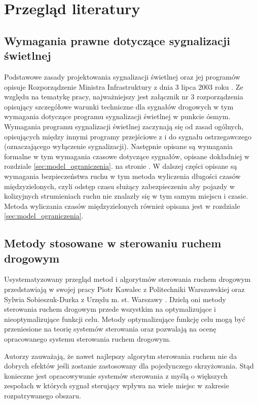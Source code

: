 \chapter{Przegląd literatury}
\section{Wymagania prawne dotyczące sygnalizacji świetlnej}
Podstawowe zasady projektowania sygnalizacji świetlnej oraz jej programów opisuje Rozporządzenie Ministra Infrastruktury z dnia 3 lipca 2003 roku \cite{rozporzadzenie}.
Ze względu na tematykę pracy, najważniejszy jest załącznik nr 3 rozporządzenia opisujący szczegółowe warunki techniczne dla sygnałów drogowych w tym wymagania dotyczące programu sygnalizacji świetlnej w punkcie ósmym.
Wymagania programu sygnalizacji świetlnej zaczynają się od zasad ogólnych, opisujących między innymi programy przejściowe z i do sygnału ostrzegawczego (oznaczającego wyłączenie sygnalizacji). Następnie opisane są wymagania formalne w tym wymagania czasowe dotyczące sygnałów, opisane dokładniej w rozdziale \ref{sec:model_ograniczenia}. na stronie \pageref{sec:model_ograniczenia}.
W dalszej części opisane są wymagania bezpieczeństwa ruchu w tym metoda wyliczenia długości czasów międzyzielonych, czyli odstęp czasu służący zabezpieczeniu aby pojazdy w kolizyjnych strumieniach ruchu nie znalazły się w tym samym miejscu i czasie. Metoda wyliczania czasów międzyzielonych również opisana jest w rozdziale \ref{sec:model_ograniczenia}.

\section{Metody stosowane w sterowaniu ruchem drogowym}
Usystematyzowany przegląd metod i algorytmów sterowania ruchem drogowym przedstawiają w swojej pracy Piotr Kawalec z Politechniki Warszawskiej oraz Sylwia Sobieszuk-Durka z Urzędu m. st. Warszawy \cite{kawalec+sobieszuk-durka}. Dzielą oni metody sterowania ruchem drogowym przede wszystkim na optymalizujące i nieoptymalizujące funkcji celu. Metody optymalizujące funkcję celu mogą być przeniesione na teorię systemów sterowania oraz pozwalają na ocenę opracowanego systemu sterowania ruchem drogowym.

Autorzy zauważają, że nawet najlepszy algorytm sterowania ruchem nie da dobrych efektów jeśli zostanie zastosowany dla pojedynczego skrzyżowania. Stąd konieczne jest opracowywanie systemów sterowania z myślą o większych zespołach w których sygnał sterujący wpływa na wiele miejsc w zakresie rozpatrywanego obszaru.

